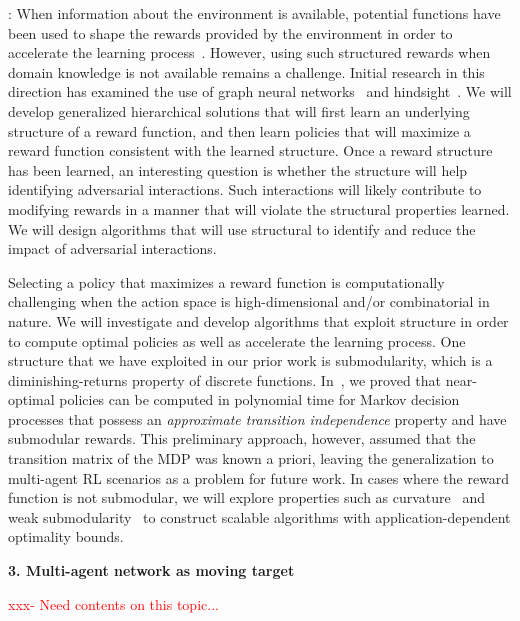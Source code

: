 \documentclass{NSF}
\begin{document}
:
When information about the environment is available, potential functions have been used to shape the rewards provided by the environment in order to accelerate the learning process~\cite{ng1999policy, devlin2011empirical, devlin2014potential, harutyunyan2015expressing}. However, using such structured rewards when domain knowledge is not available remains a challenge. Initial research in this direction has examined the use of graph neural networks~\cite{klissarov2020reward} and hindsight~\cite{mesnard2021counterfactual}. We will develop generalized hierarchical solutions that will first learn an underlying structure of a reward function, and then learn policies that will maximize a reward function consistent with the learned structure. Once a reward structure has been learned, an interesting question is whether the structure will help identifying adversarial interactions. Such interactions will likely contribute to modifying rewards in a manner that will violate the structural properties learned. We will design algorithms that will use structural to identify and reduce the impact of adversarial interactions.

Selecting a policy that maximizes a reward function is computationally challenging when the action space is high-dimensional and/or combinatorial in nature. We will investigate and develop algorithms that exploit structure in order to compute optimal policies as well as accelerate the learning process. One structure that we have exploited in our prior work is submodularity, which is a diminishing-returns property of discrete functions. In~\cite{sahabandu2021scalable}, we proved that near-optimal policies can be computed in polynomial time for Markov decision processes that possess an \emph{approximate transition independence} property and have submodular rewards. This preliminary approach, however, assumed that the transition matrix of the MDP was known a priori, leaving the generalization to multi-agent RL scenarios as a problem for future work. In cases where the reward function is not submodular, we will explore properties such as curvature~\cite{sviridenko2017optimal} and weak submodularity~\cite{liu2018controlled, liu2018minimal} to construct scalable algorithms with application-dependent optimality bounds.




\noindent \textbf{3. Multi-agent network as moving target}

\textcolor{red}{xxx- Need contents on this topic...}
\end{document}

